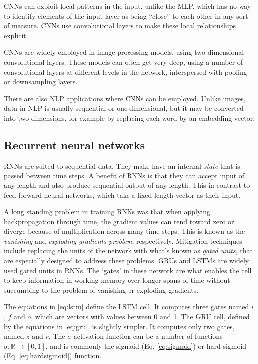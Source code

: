 \acp{CNN} can exploit local patterns in the input, unlike the \ac{MLP}, which
has no way to identify elements of the input layer as being ``close'' to each
other in any sort of measure. \acp{CNN} use convolutional layers to make
these local relationships explicit.

\acp{CNN} are widely employed in image processing models, using
two-di\-men\-sional convolutional layers. These models can often get very
deep, using a number of convolutional layers at different levels in the
network, interspersed with pooling or downsampling layers.

There are also \ac{NLP} applications where \acp{CNN} can be employed. Unlike
images, data in \ac{NLP} is usually sequential or one-dimensional, but it may
be converted into two dimensions, for example by replacing each word by an
embedding vector.


\subsection{Recurrent neural networks}
\label{seq:rnn}

\acp{RNN} are suited to sequential data. They make have an internal
\emph{state} that is passed between time steps. A benefit of \acp{RNN} is
that they can accept input of any length and also produce sequential output
of any length. This in contrast to feed-forward neural networks, which take a
fixed-length vector as their input.

A long standing problem in training \acp{RNN} was that when applying
backpropagation through time, the gradient values can tend toward zero or
diverge because of multiplication across many time steps. This is known as
the \emph{vanishing} and \emph{exploding gradients problem}, respectively.
Mitigation techniques include replacing the units of the network with what's
known as \emph{gated units}, that are especially designed to address these
problems. \acp{GRU} and \acp{LSTM} are widely used gated units in RNNs. The
`gates' in these network are what enables the cell to keep information in
working memory over longer spans of time without succumbing to the problem of
vanishing or exploding gradients.

The equations in \ref{eq:lstm} define the LSTM cell. It computes three gates
named $i$, $f$ and $o$, which are vectors with values between 0 and 1. The
GRU cell, defined by the equations in \ref{eq:gru}, is slightly simpler. It
computes only two gates, named $z$ and $r$. The $\sigma$ activation function
can be a number of functions $\sigma : \mathbb{R} \rightarrow [0, 1]$, and is
commonly the sigmoid (Eq. \ref{eq:sigmoid}) or hard sigmoid (Eq.
\ref{eq:hardsigmoid}) function.


